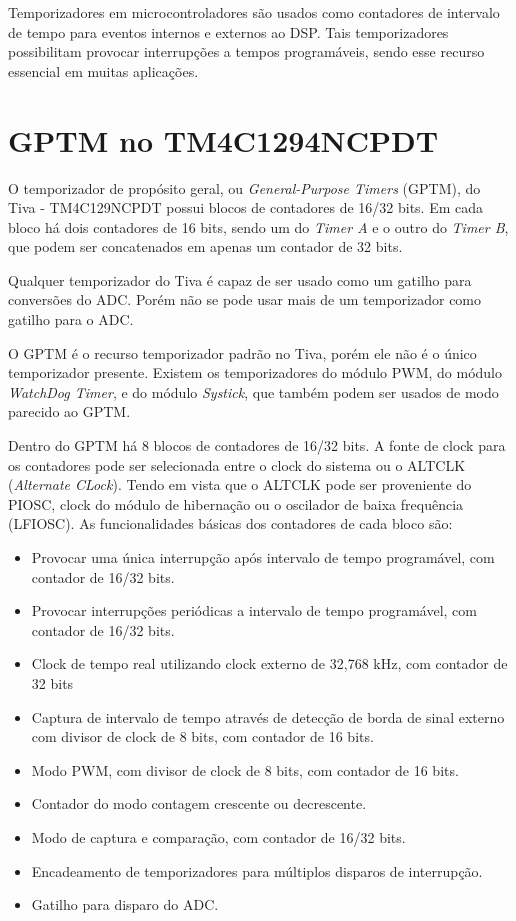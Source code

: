 
Temporizadores em microcontroladores são usados como contadores de intervalo de tempo para eventos internos e externos ao DSP. Tais temporizadores possibilitam provocar interrupções a tempos programáveis, sendo esse recurso essencial em muitas aplicações.  

\section{GPTM no TM4C1294NCPDT}

O temporizador de propósito geral, ou \emph{General-Purpose Timers} (GPTM),  do Tiva - TM4C129NCPDT possui blocos de contadores de 16/32 bits. Em cada bloco há dois contadores de 16 bits, sendo um do \emph{Timer A} e o outro do \emph{Timer B}, que podem ser concatenados em apenas um contador de 32 bits.

Qualquer temporizador do Tiva é capaz de ser usado como um gatilho para conversões do ADC. Porém não se pode usar mais de um temporizador como gatilho para o ADC.

O GPTM é o recurso temporizador padrão no Tiva, porém ele não é o único temporizador presente. Existem os temporizadores do módulo PWM, do módulo \emph{WatchDog Timer}, e do módulo \emph{Systick}, que também podem ser usados de modo parecido ao GPTM. 

Dentro do GPTM há 8 blocos de contadores de 16/32 bits. A fonte de clock para os contadores pode ser selecionada entre o clock do sistema ou o ALTCLK (\emph{Alternate CLock}). Tendo em vista que o ALTCLK pode ser proveniente do PIOSC, clock do módulo de hibernação ou o oscilador de baixa frequência (LFIOSC).  As funcionalidades básicas dos contadores de cada bloco são: 

\begin{itemize}
	\item Provocar uma única interrupção após intervalo de tempo programável, com contador de 16/32 bits.
	\item Provocar interrupções periódicas a intervalo de tempo programável, com contador de 16/32 bits.
	\item Clock de tempo real utilizando clock externo de 32,768 kHz, com contador de 32 bits
	\item Captura de intervalo de tempo através de detecção de borda de sinal externo com divisor de clock de 8 bits, com contador de 16 bits. 
	\item Modo PWM, com divisor de clock de 8 bits, com contador de 16 bits.
	\item Contador do modo contagem crescente ou decrescente.
	\item Modo de captura e comparação, com contador de 16/32 bits.
	\item Encadeamento de temporizadores para múltiplos disparos de interrupção.
	\item Gatilho para disparo do ADC.
\end{itemize}

